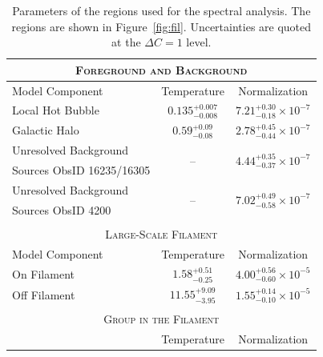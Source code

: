 \begin{figure}
\end{figure}

\begin{table}
  \caption{Parameters of the regions used for the spectral analysis. The regions are shown in Figure~\ref{fig:fil}. Uncertainties are quoted at the $\Delta C = 1$ level. \label{tab:spectra}}
  \begin{center}
    \begin{threeparttable}
      \begin{tabular}{l c c}
              \multicolumn{3}{c}{\textsc{Foreground and Background}} \\
              \hline\hline
              Model Component & Temperature\tnote{a} & Normalization\tnote{b} \\
              \hline
              Local Hot Bubble & $0.135_{-0.008}^{+0.007}$ & $7.21_{-0.18}^{+0.30} \times 10^{-7}$ \\
              Galactic Halo & $0.59_{-0.08}^{+0.09}$ & $2.78_{-0.44}^{+0.45} \times 10^{-7}$ \\
              Unresolved Background       &\multirow{2}{*}{ -- } & \multirow{2}{*}{ $4.44_{-0.37}^{+0.35} \times 10^{-7}$} \\
              Sources ObsID 16235/16305 &                                    &            \\
              Unresolved Background       &\multirow{2}{*}{ -- } & \multirow{2}{*}{ $7.02_{-0.58}^{+0.49} \times 10^{-7}$} \\
              Sources ObsID 4200               &                                    &            \\
              \multicolumn{3}{c}{} \\
              \multicolumn{3}{c}{\textsc{Large-Scale Filament}} \\
              \hline\hline
                Model Component & Temperature\tnote{a} & Normalization\tnote{b} \\
              \hline
               On Filament & $1.58_{-0.25}^{+0.51}$ & $4.00_{-0.60}^{+0.56} \times 10^{-5}$ \\
               Off Filament & $11.55_{-3.95}^{+9.09}$ & $1.55_{-0.10}^{+0.14} \times 10^{-5}$  \\
               \multicolumn{3}{c}{} \\
              \multicolumn{3}{c}{\textsc{Group in the Filament}} \\
              \hline\hline
                             & Temperature\tnote{a} & Normalization\tnote{b} \\

\end{tabular}
\end{threeparttable}
\end{center}
\end{table}
